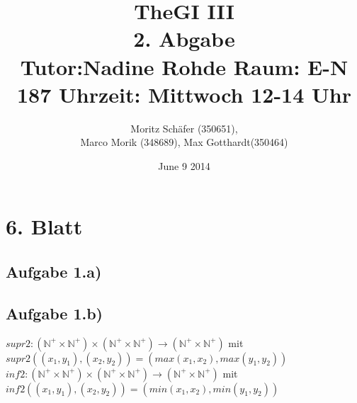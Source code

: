 \documentclass[10pt,a4paper,german,landscape]{article} \usepackage[utf8]{inputenc} %
\begin{document}
\title{TheGI III \\
2. Abgabe\\
Tutor:Nadine Rohde Raum: E-N 187 Uhrzeit: Mittwoch 12-14 Uhr \\ } %
\author{Moritz Schäfer (350651), \\
Marco Morik (348689), Max Gotthardt(350464)} %
\date{June 9 2014} %

\maketitle



\newpage

\section*{6. Blatt } %
\subsection*{Aufgabe 1.a)}



\subsection*{Aufgabe 1.b)}

$ supr2 : (\mathbb N^{+} \times \mathbb N^{+} ) \times (\mathbb N^{+} \times \mathbb N^{+} ) \rightarrow (\mathbb N^{+} \times \mathbb N^{+} )$ mit \\
$ supr2((x_1,y_1),(x_2,y_2)) = (max(x_1, x_2), max(y_1, y_2)) $
$ inf2 : (\mathbb N^{+} \times \mathbb N^{+} ) \times (\mathbb N^{+} \times \mathbb N^{+} ) \rightarrow (\mathbb N^{+} \times \mathbb N^{+} )$ mit \\
$ inf2((x_1,y_1),(x_2,y_2)) = (min(x_1, x_2), min(y_1, y_2)) $
\end{document}
